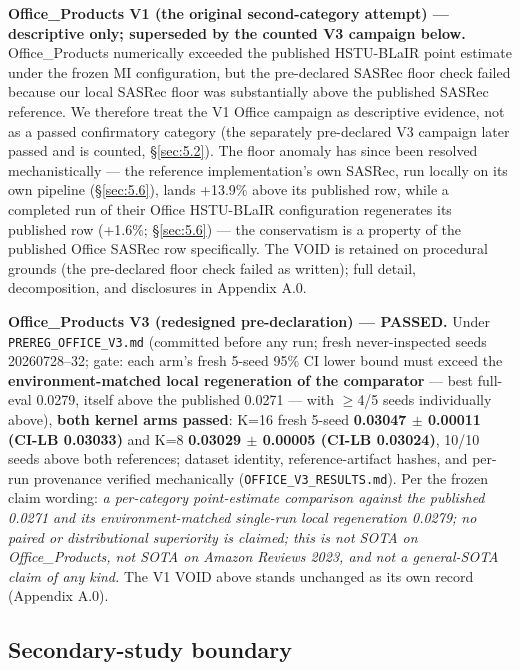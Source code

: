 

\textbf{Office\_Products V1 (the original second-category attempt) --- descriptive only; superseded by the counted V3 campaign below.} Office\_Products numerically exceeded the published HSTU-BLaIR point estimate under the frozen MI configuration, but the pre-declared SASRec floor check failed because our local SASRec floor was substantially above the published SASRec reference. We therefore treat the V1 Office campaign as descriptive evidence, not as a passed confirmatory category (the separately pre-declared V3 campaign later passed and is counted, \S\ref{sec:5.2}). The floor anomaly has since been resolved mechanistically --- the reference implementation's own SASRec, run locally on its own pipeline (\S\ref{sec:5.6}), lands +13.9\% above its published row, while a completed run of their Office HSTU-BLaIR configuration regenerates its published row (+1.6\%; \S\ref{sec:5.6}) --- the conservatism is a property of the published Office SASRec row specifically. The VOID is retained on procedural grounds (the pre-declared floor check failed as written); full detail, decomposition, and disclosures in Appendix A.0.

\textbf{Office\_Products V3 (redesigned pre-declaration) --- PASSED.} Under \texttt{PREREG\_OFFICE\_V3.md} (committed before any run; fresh never-inspected seeds 20260728--32; gate: each arm's fresh 5-seed 95\% CI lower bound must exceed the \textbf{environment-matched local regeneration of the comparator} --- best full-eval 0.0279, itself above the published 0.0271 --- with \ensuremath{\ge}4/5 seeds individually above), \textbf{both kernel arms passed}: K=16 fresh 5-seed \textbf{0.03047 \ensuremath{\pm} 0.00011 (CI-LB 0.03033)} and K=8 \textbf{0.03029 \ensuremath{\pm} 0.00005 (CI-LB 0.03024)}, 10/10 seeds above both references; dataset identity, reference-artifact hashes, and per-run provenance verified mechanically (\texttt{OFFICE\_V3\_RESULTS.md}). Per the frozen claim wording: \emph{a per-category point-estimate comparison against the published 0.0271 and its environment-matched single-run local regeneration 0.0279; no paired or distributional superiority is claimed; this is not SOTA on Office\_Products, not SOTA on Amazon Reviews 2023, and not a general-SOTA claim of any kind.} The V1 VOID above stands unchanged as its own record (Appendix A.0).


\subsection{Secondary-study boundary}\label{sec:secondary-main}
\label{sec:5.3}\label{sec:5.4}\label{sec:5.4.1}\label{sec:5.4.2}
\label{sec:5.5}\label{sec:5.6}\label{sec:5.7}\label{sec:5.8}

